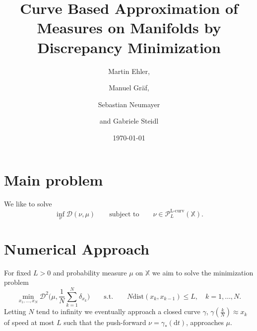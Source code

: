 \documentclass[draft,
a4paper,11pt,DIV=11,%
abstract=on%
]{scrartcl}
\DeclareMathOperator{\Lcurve}{L-curv}
\begin{document}
\title{Curve Based Approximation of Measures on Manifolds by Discrepancy Minimization}

\author{
Martin Ehler\footnotemark[1],
\and
Manuel Gr\"af\footnotemark[2],
\and
Sebastian Neumayer\footnotemark[3]
\and
and Gabriele Steidl\footnotemark[3]
}
\maketitle

\date{\today}



\begin{abstract}
	\noindent\small
	

\end{abstract}

\section{Main problem}

We like to solve
\begin{equation}
  \label{eq:min_PL}
  \inf_{\nu} \mathscr D(\nu,\mu) \qquad \text{subject to} \qquad \nu \in \mathcal P_{L}^{\Lcurve}(\mathbb X).
\end{equation}

\section{Numerical Approach}

For fixed $L>0$ and probability measure $\mu$ on $\mathbb X$ we aim to solve the minimization problem
\begin{equation}
  \label{eq:constant_speed_min}
  \min_{x_{1},\dots,x_{N}} \mathscr{D}^{2} \Big(\mu, \frac{1}{N} \sum_{k=1}^{N} \delta_{x_{k}}\Big) \qquad \mathrm{s.t.} \qquad    N \mathrm{dist}(x_{k},x_{k-1}) \le L, \quad k=1,\dots,N.
\end{equation}
Letting $N$ tend to infinity we eventually approach a closed curve $\gamma$, $\gamma(\tfrac kN) \approx x_{k}$ of speed at most $L$ such that the push-forward $\nu = \gamma_{*}(\mathrm dt)$, approaches $\mu$.  
\end{document}
